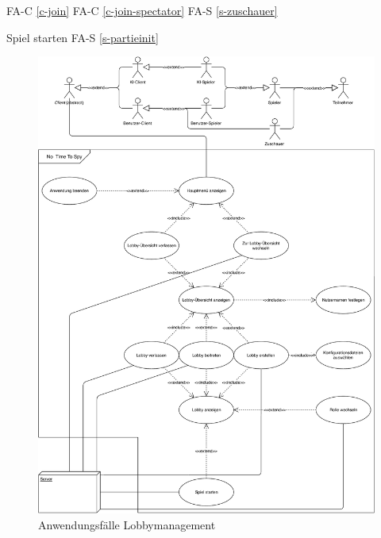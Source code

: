 FA-C \ref{c-join} %
FA-C \ref{c-join-spectator} %
FA-S \ref{s-zuschauer} %

Spiel starten
FA-S \ref{s-partieinit} %


\begin{figure}
  \centering
  \includegraphics[width=\textwidth]{Meilenstein02/use_case_lobbymanagement.pdf}
  \caption{Anwendungsfälle Lobbymanagement}
\end{figure}